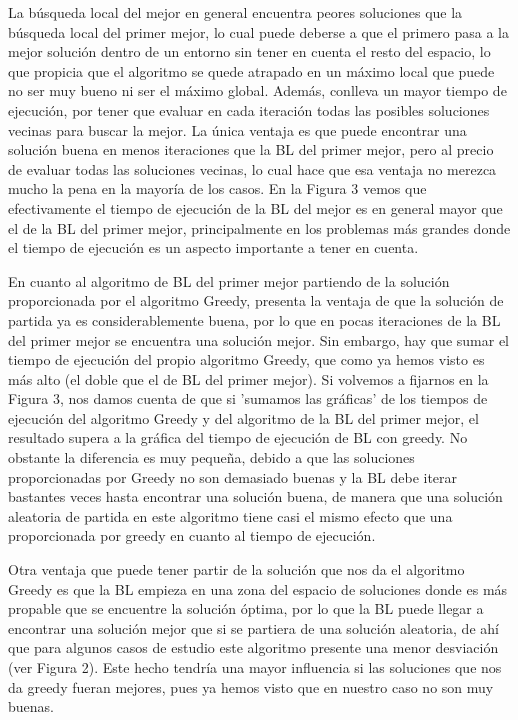 \documentclass[11pt,a4paper]{article}
\begin{document}
	 La búsqueda local del mejor en general encuentra peores soluciones que la búsqueda local del primer mejor, lo cual puede deberse a que el primero pasa a la mejor solución dentro de un entorno sin tener en cuenta el resto del espacio, lo que propicia que el algoritmo se quede atrapado en un máximo local que puede no ser muy bueno ni ser el máximo global. Además, conlleva un mayor tiempo de ejecución, por tener que evaluar en cada iteración todas las posibles soluciones vecinas para buscar la mejor. La única ventaja es que puede encontrar una solución buena en menos iteraciones que la BL del primer mejor, pero al precio de evaluar todas las soluciones vecinas, lo cual hace que esa ventaja no merezca mucho la pena en la mayoría de los casos. En la Figura 3 vemos que efectivamente el tiempo de ejecución de la BL del mejor es en general mayor que el de la BL del primer mejor, principalmente en los problemas más grandes donde el tiempo de ejecución es un aspecto importante a tener en cuenta. 
	 
	 En cuanto al algoritmo de BL del primer mejor partiendo de la solución proporcionada por el algoritmo Greedy, presenta la ventaja de que la solución de partida ya es considerablemente buena, por lo que en pocas iteraciones de la BL del primer mejor se encuentra una solución mejor. Sin embargo, hay que sumar el tiempo de ejecución del propio algoritmo Greedy, que como ya hemos visto es más alto (el doble que el de BL del primer mejor). Si volvemos a fijarnos en la Figura 3, nos damos cuenta de que si 'sumamos las gráficas' de los tiempos de ejecución del algoritmo Greedy y del algoritmo de la BL del primer mejor, el resultado supera a la gráfica del tiempo de ejecución de BL con greedy. No obstante la diferencia es muy pequeña, debido a que las soluciones proporcionadas por Greedy no son demasiado buenas y la BL debe iterar bastantes veces hasta encontrar una solución buena, de manera que una solución aleatoria de partida en este algoritmo tiene casi el mismo efecto que una proporcionada por greedy en cuanto al tiempo de ejecución. 
	 
	 Otra ventaja que puede tener partir de la solución que nos da el algoritmo Greedy es que la BL empieza en una zona del espacio de soluciones donde es más propable que se encuentre la solución óptima, por lo que la BL puede llegar a encontrar una solución mejor que si se partiera de una solución aleatoria, de ahí que para algunos casos de estudio este algoritmo presente una menor desviación (ver Figura 2). Este hecho tendría una mayor influencia si las soluciones que nos da greedy fueran mejores, pues ya hemos visto que en nuestro caso no son muy buenas. 
	 
\end{document}
